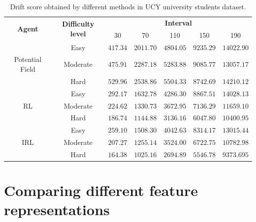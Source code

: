 \begin{table}[htbp]
	\begin{center}
		\renewcommand{\arraystretch}{1.3}
		\begin{tabular}{|c|c|c|c|c|c|c|}
			\hline
			 \multicolumn{1}{|c|}{\multirow{2}{*}{\textbf{Agent}}} & \multicolumn{1}{c|}{\multirow{2}{*}{\textbf{Difficulty level}}}  & \multicolumn{5}{c|}{\multirow{1}{*}{\textbf{Interval}}}\\ \cline{3-7}
				
			 && 30 & 70 & 110 & 150  &  190 \\
			\hline
								& Easy & $417.34$ & $2011.70$ & $4804.05$ & $9235.29$ & $14022.90$ \\ \cline{2-7}
			Potential Field & Moderate & $475.91$ & $2287.18$ & $5283.88$ & $9085.77$ & $13057.17$ \\  \cline{2-7}
								& Hard & $529.96$ & $2538.86$ & $5504.33$ & $8742.69$ & $14210.12$ \\
								\hline
		    	 & Easy & $292.17$ & $1632.78$ & $4286.30$ & $8867.51$ & $14028.13$ \\ \cline{2-7}
		    RL	 & Moderate & $224.62$ & $1330.73$ & $3672.95$ & $7136.29$ & $11659.10$ \\ \cline{2-7}
		    	 & Hard & $186.74$ & $1144.88$ & $3136.16$ & $6047.80$ & $10400.95$ \\
							 	\hline
						& Easy & $259.10$ & $1508.30$ & $4042.63$ & $8314.17$ & $13015.44$ \\ \cline{2-7}
				IRL  & Moderate & $207.27$ & $1255.14$ & $3524.00$ & $6722.75$ & $10782.98$ \\ \cline{2-7}
						& Hard & $164.38$ & $1025.16$ & $2694.89$ & $5546.78$ & $9373.695$ \\
			\hline
		\end{tabular}
	\end{center}
	\caption{Drift score obtained by different methods in UCY university students dataset.}
	\label{tab:ucy_inter_method_drift_results}
\end{table}

\section{Comparing different feature representations}
\label{sec:comparing-other-featreps}
